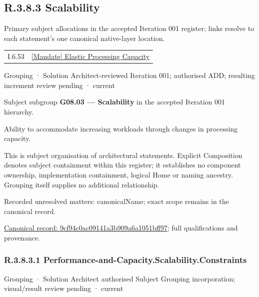\subsection*{R.3.8.3 Scalability}
\label{navigation:R.3.8.3}

Primary subject allocations in the accepted Iteration 001 register; links resolve to each statement’s one canonical native-layer location.\par
\begin{longtable}{p{.22\linewidth}p{.73\linewidth}}
I.6.53 & \hyperref[element:ea33d8db942f4b5b9e322d74cbfe975b]{[Mandate] Elastic Processing Capacity} \\
\end{longtable}
\label{element:9cf94c0ac09141a3b909a6a1051bff97}
{\small Grouping · Solution Architect-reviewed Iteration 001; authorised ADD; resulting increment review pending · current}\par

Subject subgroup \textbf{G08.03 — Scalability} in the accepted Iteration 001 hierarchy.



Ability to accommodate increasing workloads through changes in processing capacity.



This is subject organisation of architectural statements. Explicit Composition denotes subject containment within this register; it establishes no component ownership, implementation containment, logical Home or naming ancestry. Grouping itself supplies no additional relationship.


{\small Recorded unresolved matters: canonicalName; exact scope remains in the canonical record.}\par
{\footnotesize \href{../../../../continuum/grouping/9cf94c0ac09141a3b909a6a1051bff97.md}{Canonical record: 9cf94c0ac09141a3b909a6a1051bff97}; full qualifications and provenance.}\par
\subsubsection*{R.3.8.3.1 Performance-and-Capacity.Scalability.Constraints}
\label{navigation:R.3.8.3.1}

\label{element:028a5b5f4b0e458a91489cac0513955d}
{\small Grouping · Solution Architect authorised Subject Grouping incorporation; visual/result review pending · current}\par

